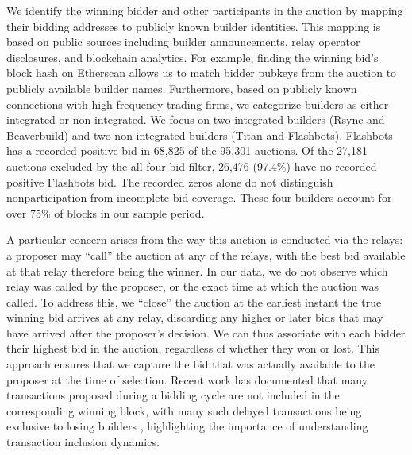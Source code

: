 \documentclass[12pt,reqno]{amsart}
\begin{document}
We identify the winning bidder and other participants in the auction by mapping their bidding addresses to publicly known builder identities. This mapping is based on public sources including builder announcements, relay operator disclosures, and blockchain analytics. For example, finding the winning bid’s block hash on Etherscan allows us to match bidder pubkeys from the auction to publicly available builder names. Furthermore, based on publicly known connections with high-frequency trading firms, we categorize builders as either integrated or non-integrated. We focus on two integrated builders (Rsync and Beaverbuild) and two non-integrated builders (Titan and Flashbots). Flashbots has a recorded positive bid in 68,825 of the 95,301 auctions. Of the 27,181 auctions excluded by the all-four-bid filter, 26,476 (97.4\%) have no recorded positive Flashbots bid. The recorded zeros alone do not distinguish nonparticipation from incomplete bid coverage. These four builders account for over 75\% of blocks in our sample period. 

A particular concern arises from the way this auction is conducted via the relays: a proposer may ``call'' the auction at any of the relays, with the best bid available at that relay therefore being the winner. In our data, we do not observe which relay was called by the proposer, or the exact time at which the auction was called. To address this, we ``close'' the auction at the earliest instant the true winning bid arrives at any relay, discarding any higher or later bids that may have arrived after the proposer's decision. We can thus associate with each bidder their highest bid in the auction, regardless of whether they won or lost. This approach ensures that we capture the bid that was actually available to the proposer at the time of selection. Recent work has documented that many transactions proposed during a bidding cycle are not included in the corresponding winning block, with many such delayed transactions being exclusive to losing builders \citep{canidio2024becomingimmutable}, highlighting the importance of understanding transaction inclusion dynamics.
\end{document}
